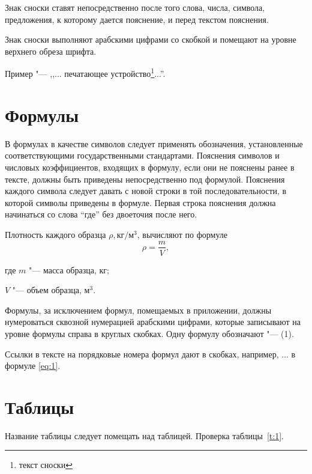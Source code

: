 \documentclass[russian,koi8-r,pointsection]{eskdtext}
\begin{document}
\point Знак сноски ставят непосредственно после того слова, числа,
символа, предложения, к которому дается пояснение, и перед текстом
пояснения.

\point Знак сноски выполняют арабскими цифрами со скобкой и помещают
на уровне верхнего обреза шрифта.

Пример "--- ,,... печатающее устройство\footnote{текст сноски}...''.

\section{Формулы}
\point В формулах в качестве символов следует применять
обозначения, установленные соответствующими государственными
стандартами. Пояснения символов и числовых коэффициентов, входящих
в формулу, если они не пояснены ранее в тексте, должны быть
приведены непосредственно под формулой. Пояснения каждого символа
следует давать с новой строки в той последовательности, в которой
символы приведены в формуле. Первая строка пояснения должна
начинаться со слова ``где'' без двоеточия после него.

Плотность каждого образца $\rho, \text{кг}/\text{м}^3$, вычисляют
по формуле
\begin{equation}
\label{eq:1}
\rho = \frac{m}{V},
\end{equation}
\begin{ESKDexplanation}
\item[где ] $m$ "--- масса образца, кг;
\item $V$ "--- объем образца, $\text{м}^3$.
\end{ESKDexplanation}

\point Формулы, за исключением формул, помещаемых в приложении,
должны нумероваться сквозной нумерацией арабскими цифрами, которые
записывают на уровне формулы справа в круглых скобках. Одну формулу
обозначают "--- (1).

Ссылки в тексте на порядковые номера формул дают в скобках,
например, ... в формуле \eqref{eq:1}.

\section{Таблицы}
Название таблицы следует помещать над таблицей. Проверка
таблицы~\ref{t:1}.
\end{document}
